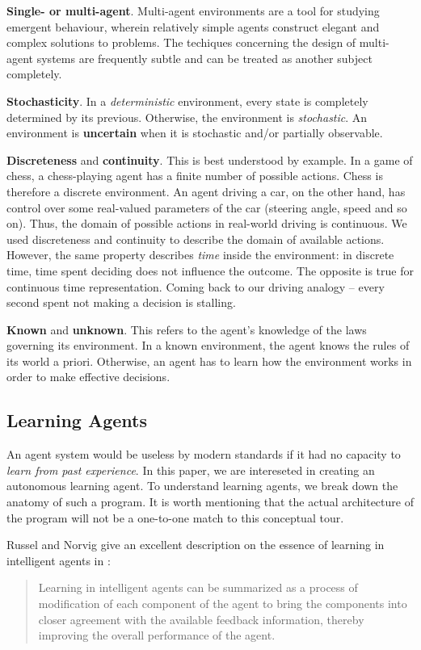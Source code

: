 \textbf{Single- or multi-agent}.
Multi-agent environments are a tool for studying emergent behaviour, wherein relatively simple agents construct elegant and complex solutions to problems.
The techiques concerning the design of multi-agent systems are frequently subtle and can be treated as another subject completely.

\textbf{Stochasticity}.
In a \emph{deterministic} environment, every state is completely determined by its previous. Otherwise, the environment is \emph{stochastic}. An environment is \textbf{uncertain} when it is stochastic and/or partially observable.

\textbf{Discreteness} and \textbf{continuity}.
This is best understood by example.
In a game of chess, a chess-playing agent has a finite number of possible actions.
Chess is therefore a discrete environment.
An agent driving a car, on the other hand, has control over some real-valued parameters of the car (steering angle, speed and so on).
Thus, the domain of possible actions in real-world driving is continuous.
We used discreteness and continuity to describe the domain of available actions.
However, the same property describes \emph{time} inside the environment: in discrete time, time spent deciding does not influence the outcome. The opposite is true for continuous time representation. Coming back to our driving analogy -- every second spent not making a decision is stalling.

\textbf{Known} and \textbf{unknown}.
This refers to the agent's knowledge of the laws governing its environment. In a known environment, the agent knows the rules of its world a priori. Otherwise, an agent has to learn how the environment works in order to make effective decisions.


\subsection{Learning Agents} \label{learning-agents}
An agent system would be useless by modern standards if it had no capacity to \emph{learn from past experience}.
In this paper, we are intereseted in creating an autonomous learning agent.
To understand learning agents, we break down the anatomy of such a program.
It is worth mentioning that the actual architecture of the program will not be a one-to-one match to this conceptual tour.

Russel and Norvig give an excellent description on the essence of learning in intelligent agents in \cite{aima}: 
\begin{quote}
    Learning in intelligent agents can be summarized as a process of modification of each component of the agent to bring the components into closer agreement with the available feedback information, thereby improving the overall performance of the agent.
\end{quote}

